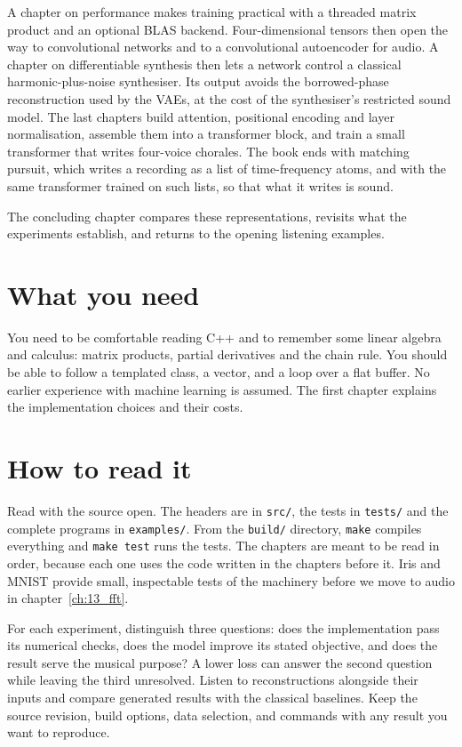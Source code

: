 A chapter on performance makes training practical with a threaded matrix
product and an optional BLAS backend.  Four-dimensional tensors then open
the way to convolutional networks and to a convolutional autoencoder for
audio.  A chapter on differentiable synthesis then lets a network control
a classical harmonic-plus-noise synthesiser. Its output avoids the
borrowed-phase reconstruction used by the VAEs, at the cost of the
synthesiser's restricted sound model. The last chapters build attention, positional
encoding and layer normalisation, assemble them into a transformer
block, and train a small transformer that writes four-voice chorales.
The book ends with matching pursuit, which writes a recording as a list
of time-frequency atoms, and with the same transformer trained on such
lists, so that what it writes is sound.

The concluding chapter compares these representations, revisits what the
experiments establish, and returns to the opening listening examples.

\section*{What you need}

You need to be comfortable reading C++ and to remember some linear algebra
and calculus: matrix products, partial derivatives and the chain rule.
You should be able to follow a templated class, a vector, and a loop over
a flat buffer. No earlier experience with machine learning is assumed.
The first chapter explains the implementation choices and their costs.

\section*{How to read it}

Read with the source open.  The headers are in \texttt{src/}, the tests in
\texttt{tests/} and the complete programs in \texttt{examples/}.  From the
\texttt{build/} directory, \texttt{make} compiles everything and
\texttt{make test} runs the tests.  The chapters are meant to be read in
order, because each one uses the code written in the chapters before it.
Iris and MNIST provide small, inspectable tests of the machinery before
we move to audio in chapter~\ref{ch:13_fft}.

For each experiment, distinguish three questions: does the implementation
pass its numerical checks, does the model improve its stated objective,
and does the result serve the musical purpose? A lower loss can answer
the second question while leaving the third unresolved. Listen to
reconstructions alongside their inputs and compare generated results
with the classical baselines. Keep the source revision, build options,
data selection, and commands with any result you want to reproduce.

